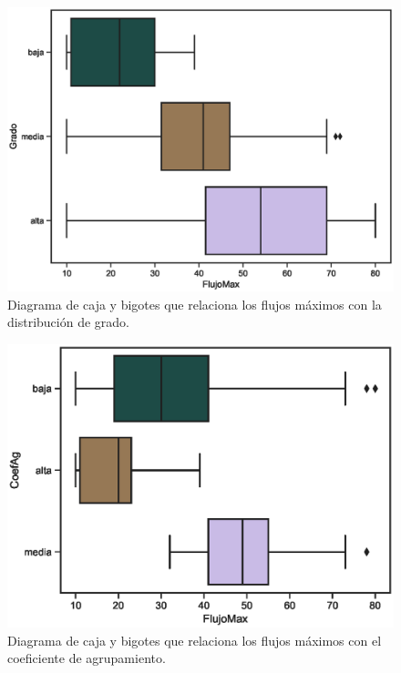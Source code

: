 \documentclass{article}
\begin{document}
\begin{center}
\begin{figure}[htbp]
\includegraphics[scale=0.6]{boxplot_FlujoMaxGrado.eps}
\caption{Diagrama de caja y bigotes que relaciona los flujos máximos con la distribución de grado.}
\label{fig19}
\end{figure}
\end{center}

\begin{center}
\begin{figure}[htbp]
\includegraphics[scale=0.6]{boxplot_FlujoMaxCoefAg.eps}
\caption{Diagrama de caja y bigotes que relaciona los flujos máximos con el coeficiente de agrupamiento.}
\label{fig20}
\end{figure}
\end{center}
\end{document}
